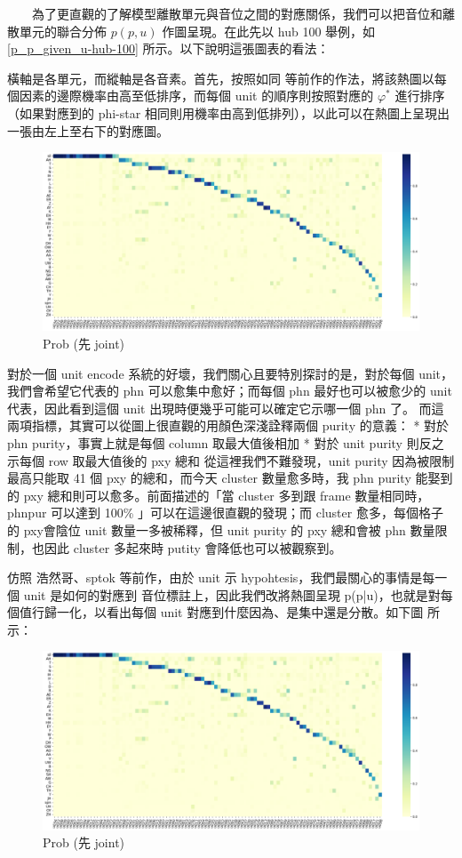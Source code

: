 　　為了更直觀的了解模型離散單元與音位之間的對應關係，我們可以把音位和離散單元的聯合分佈 \(p(p, u)\) 作圖呈現。在此先以 hub 100 舉例，如 \ref{p_p_given_u-hub-100} 所示。以下說明這張圖表的看法：

        橫軸是各單元，而縱軸是各音素。首先，按照如同  等前作的作法，將該熱圖以每個因素的邊際機率由高至低排序，而每個 unit 的順序則按照對應的 $\varphi^\ast$ 進行排序（如果對應到的 phi-star 相同則用機率由高到低排列），以此可以在熱圖上呈現出一張由左上至右下的對應圖。

{
\begin{figure}
    \centering
    \includegraphics[width=0.75\linewidth]{figures/byprob.png}
    \caption{Prob (先 joint)}
    \label{fig:prob}
\end{figure}
}


        對於一個 unit encode 系統的好壞，我們關心且要特別探討的是，對於每個 unit，我們會希望它代表的 phn 可以愈集中愈好；而每個 phn 最好也可以被愈少的 unit 代表，因此看到這個 unit 出現時便幾乎可能可以確定它示哪一個 phn 了。
        而這兩項指標，其實可以從圖上很直觀的用顏色深淺詮釋兩個 purity 的意義：
        * 對於 phn purity，事實上就是每個 column 取最大值後相加
        * 對於 unit purity 則反之示每個 row 取最大值後的 pxy 總和
        從這裡我們不難發現，unit purity 因為被限制最高只能取 41 個 pxy 的總和，而今天 cluster 數量愈多時，我 phn purity 能娶到的 pxy 總和則可以愈多。前面描述的「當 cluster 多到跟 frame 數量相同時，phnpur 可以達到 100\% 」可以在這邊很直觀的發現；而 cluster 愈多，每個格子的 pxy會陰位 unit 數量一多被稀釋，但 unit purity 的 pxy 總和會被 phn 數量限制，也因此 cluster 多起來時 putity 會降低也可以被觀察到。

        仿照 浩然哥、sptok 等前作，由於 unit 示 hypohtesis，我們最關心的事情是每一個 unit 是如何的對應到 音位標註上，因此我們改將熱圖呈現 p(p|u)，也就是對每個值行歸一化，以看出每個 unit 對應到什麼因為、是集中還是分散。如下圖  所示：


{
\begin{figure}
    \centering
    \includegraphics[width=0.75\linewidth]{figures/byprob.png}
    \caption{Prob (先 joint)}
    \label{fig:prob}
\end{figure}
}

